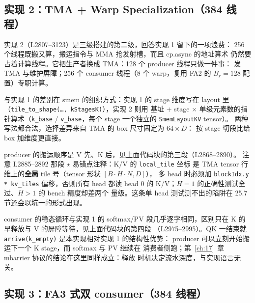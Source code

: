 \subsection{实现 2：TMA + Warp Specialization（384 线程）}

实现 2（L2807--3123）是三级搭建的第二级，回答实现 1 留下的一项浪费：
256 个线程既搬又算，搬运指令与 MMA 抢发射槽，而且 cp.async 的地址算术
仍然要占着计算线程。它把生产者换成 TMA：128 个 producer 线程只做一件事：
发 TMA 与维护屏障；256 个 consumer 线程（8 个 warp，复用 FA2 的
$B_r{=}128$ 配置）专职计算。



与实现 1 的差别在 smem 的组织方式：实现 1 的 stage 维度写在 layout 里
（\texttt{tile\_\allowbreak{}to\_\allowbreak{}shape\allowbreak{}(\dots,\allowbreak{} k\allowbreak{}Stages\allowbreak{}K)}），实现 2 则用
基址 $+$ stage $\times$ 单级元素数的指针算术（\texttt{k\_base} /
\texttt{v\_base}，每个 stage 一个独立的 \texttt{Smem\allowbreak{}Layout\allowbreak{}KV} tensor）。
两种写法都合法，选择差异来自 TMA 的 box 尺寸固定为 $64\times D$：
按 stage 切段比给 box 加维度更直接。



producer 的搬运顺序是 V 先、K 后，见上面代码块的第三段（L2868--2890）。
注意 L2885--2892 那段 $\star$ 易错点注释：K/V 的 \texttt{local\_tile} 坐标
是 TMA tensor 行维上的\textbf{全局} tile 号（tensor 形状 $[B\!\cdot\!H\!\cdot\!N, D]$），
多 head 时必须加 \texttt{blockIdx.y * kv\_tiles} 偏移，否则所有 head 都读
head 0 的 K/V；$H{=}1$ 的正确性测试全过、$H{>}1$ 的 bench 精度却差两个
量级。这条单 head 测试测不出的陷阱在 25.7 节还会以坑一的形式出现。

consumer 的稳态循环与实现 1 的 softmax/PV 段几乎逐字相同，区别只在
K 的早释放与 V 的屏障等待，见上面代码块的第四段
（L2975--2995）。QK 一结束就 \texttt{arrive\allowbreak{}(k\_\allowbreak{}empty)} 是本实现相对实现 1 的结构性优势：
producer 可以立刻开始搬运下一个 K stage，而 softmax 与 PV 继续在
消费者侧跑；第~\ref{ch:17}~章 mbarrier 协议的结论在这里同样成立：释放
时机决定流水深度，与实现语言无关。

\subsection{实现 3：FA3 式双 consumer（384 线程）}

